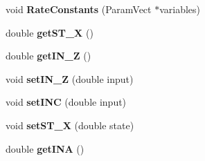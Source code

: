 \begin{DoxyCompactItemize}
\item 
void {\bfseries Rate\+Constants} (Param\+Vect $\ast$variables)\hypertarget{classIschBR_ae3455eb49140ae05f234d378c4236849}{}\label{classIschBR_ae3455eb49140ae05f234d378c4236849}

\item 
double {\bfseries get\+S\+T\+\_\+X} ()\hypertarget{classIschBR_a39f82e330fa6962061e3dc79324d3136}{}\label{classIschBR_a39f82e330fa6962061e3dc79324d3136}

\item 
double {\bfseries get\+I\+N\+\_\+Z} ()\hypertarget{classIschBR_aef5d4c03bbfebb2acd8114654f56e95c}{}\label{classIschBR_aef5d4c03bbfebb2acd8114654f56e95c}

\item 
void {\bfseries set\+I\+N\+\_\+Z} (double input)\hypertarget{classIschBR_ac4545c6df3a1a07c0e5a0d6a392b9e91}{}\label{classIschBR_ac4545c6df3a1a07c0e5a0d6a392b9e91}

\item 
void {\bfseries set\+I\+NC} (double input)\hypertarget{classIschBR_a7908eaa587eecd0e86ff29dccad896e5}{}\label{classIschBR_a7908eaa587eecd0e86ff29dccad896e5}

\item 
void {\bfseries set\+S\+T\+\_\+X} (double state)\hypertarget{classIschBR_a63d68d8e65ce5a40bd1913dd10654eda}{}\label{classIschBR_a63d68d8e65ce5a40bd1913dd10654eda}

\item 
double {\bfseries get\+I\+NA} ()\hypertarget{classIschBR_a2dfca918afb55fd1d8debfa54b2d1624}{}\label{classIschBR_a2dfca918afb55fd1d8debfa54b2d1624}

\end{DoxyCompactItemize}
